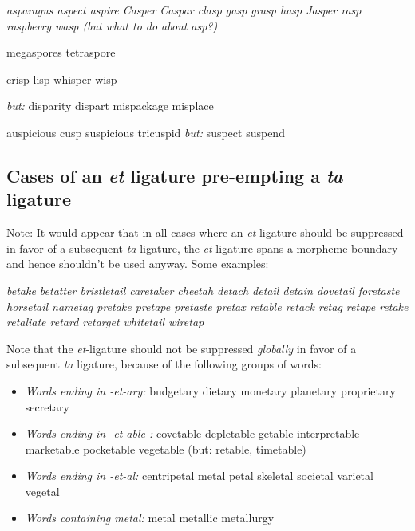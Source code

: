 \bgroup \em
asparagus aspect aspire Casper Caspar clasp gasp grasp hasp Jasper rasp raspberry wasp \emph{(but what to do about } asp?\emph{)}

megaspores tetraspore

crisp lisp whisper wisp


\emph{but:} disparity dispart mispackage misplace

auspicious cusp suspicious tricuspid \emph{but:} suspect suspend 

\egroup


\subsection*{Cases of an \emph{et} ligature pre-empting a \emph{ta} ligature}

Note: It would appear that in all cases where an \emph{et} ligature should be suppressed in favor of a subsequent \emph{ta} ligature, the \emph{et} ligature spans a morpheme boundary and hence shouldn't be used anyway. Some examples:

\bgroup \em
betake betatter bristletail caretaker cheetah 
detach detail detain dovetail 
foretaste horsetail nametag pretake
pretape pretaste pretax retable retack
retag retape retake retaliate retard retarget
whitetail wiretap

\egroup
\medskip
Note that the \emph{et}-ligature should not be suppressed \emph{globally} in favor of a subsequent \emph{ta} ligature, because of the following groups of words:

\bgroup \em
\begin{itemize}
\item \emph{Words ending in -et-ary:} 
budgetary dietary monetary planetary proprietary secretary

\item \emph{Words ending in -et-able :}
covetable depletable getable interpretable marketable pocketable vegetable (but: retable, timetable)

\item \emph{Words ending in -et-al:} centripetal 
metal petal skeletal societal varietal vegetal

\item \emph{Words containing metal:} metal metallic metallurgy
\end{itemize}
\egroup
